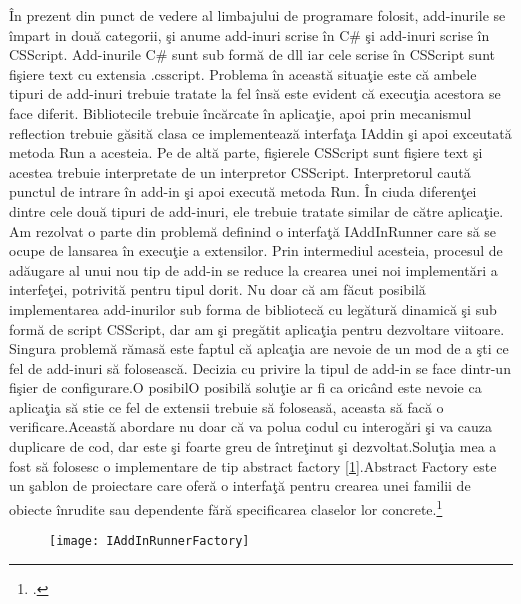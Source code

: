 \documentclass[a4paper,12pt]{report}
\let\oldref\ref
\renewcommand{\ref}[1]{[\oldref{#1}]}
\begin{document}
\^In prezent din punct de vedere al limbajului de programare folosit, add-inurile se \^impart in dou\u a categorii, \c si
anume add-inuri scrise \^in C\# \c si add-inuri scrise \^in CSScript. Add-inurile C\# sunt sub form\u a de dll iar 
cele scrise \^in CSScript sunt fi\c siere text cu extensia .csscript. Problema \^in aceast\u a situa\c tie este c\u a 
ambele tipuri de add-inuri trebuie tratate la fel \^ins\u a este evident c\u a execu\c tia acestora se face diferit.
Bibliotecile trebuie \^inc\u arcate \^in aplica\c tie, apoi prin mecanismul reflection trebuie g\u asit\u a 
clasa ce implementeaz\u a interfa\c ta IAddin \c si apoi exceutat\u a metoda Run a acesteia.
Pe de alt\u a parte, fi\c sierele CSScript sunt fi\c siere text \c si acestea trebuie interpretate de un interpretor CSScript.
Interpretorul caut\u a punctul de intrare \^in add-in \c si apoi execut\u a metoda Run. \^In ciuda diferen\c tei dintre 
cele dou\u a tipuri de add-inuri, ele trebuie tratate similar de c\u atre aplica\c tie.
Am rezolvat o parte din problem\u a definind o interfa\c t\u a IAddInRunner care s\u a se ocupe de lansarea \^in execu\c tie 
a extensilor. Prin intermediul acesteia, procesul de ad\u augare al unui nou tip de add-in se reduce la crearea unei noi
implement\u ari a interfe\c tei, potrivit\u a pentru tipul dorit. Nu doar c\u a am f\u acut posibil\u a implementarea add-inurilor
 sub forma de bibliotec\u a cu leg\u atur\u a dinamic\u a \c si sub form\u a de script CSScript, dar am \c si preg\u atit
 aplica\c tia pentru dezvoltare viitoare. Singura problem\u a r\u amas\u a este faptul c\u a aplca\c tia are nevoie de un mod
 de a \c sti ce fel de add-inuri s\u a foloseasc\u a. Decizia cu privire la tipul de add-in se face dintr-un fi\c sier de 
 configurare.O posibilO posibil\u a solu\c tie ar fi ca oric\^and este nevoie ca aplica\c tia s\u a stie ce fel de extensii trebuie 
 s\u a foloseas\u a, aceasta s\u a fac\u a o verificare.Aceast\u a abordare nu doar c\u a va polua codul cu interog\u ari
 \c si va cauza duplicare de cod, dar este \c si foarte greu de \^intre\c tinut \c si dezvoltat.Solu\c tia mea a fost
s\u a folosesc o implementare de tip abstract factory \ref{fig:IAddInRunnerFactory}.Abstract Factory este un \c sablon de proiectare care ofer\u a 
o interfa\c t\u a pentru crearea unei familii de obiecte \^inrudite sau dependente f\u ar\u a specificarea claselor
lor concrete.\footcite{Freeman:2004:HFD:1076324} 

\begin{figure}[!ht]
	\texttt{[image: IAddInRunnerFactory]}
	\label{fig:IAddInRunnerFactory}
\end{figure}
\end{document}

